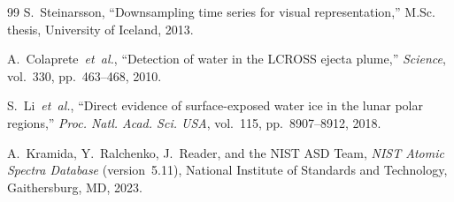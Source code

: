\documentclass[a4paper,twocolumn,10pt]{article}
\begin{document}
\begin{thebibliography}{99}
S.~Steinarsson,
``Downsampling time series for visual representation,''
M.Sc. thesis, University of Iceland, 2013.

A.~Colaprete~\emph{et~al.},
``Detection of water in the LCROSS ejecta plume,''
\textit{Science}, vol.~330, pp.~463--468, 2010.

S.~Li~\emph{et~al.},
``Direct evidence of surface-exposed water ice in the lunar polar
regions,''
\textit{Proc. Natl. Acad. Sci. USA}, vol.~115, pp.~8907--8912, 2018.

A.~Kramida, Y.~Ralchenko, J.~Reader, and the NIST ASD Team,
\textit{NIST Atomic Spectra Database} (version~5.11),
National Institute of Standards and Technology, Gaithersburg, MD,
2023.

\end{thebibliography}
\end{document}
